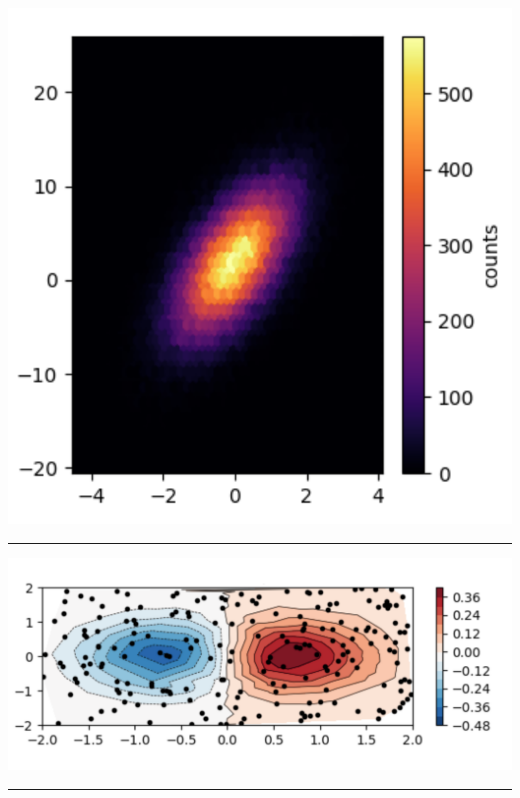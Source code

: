 \begin{task}
    \begin{gridlayout}{\textwidth}{10cm}
        \begin{row}{1}
            \begin{cell}{0.5}
                \centering
                \includegraphics[width=\cellwidth]{doc-one/img/plot-1.png}
                \rule{\cellwidth}{4pt}
            \end{cell}
            \begin{cell}{0.5}
                \centering
                \includegraphics[width=\cellwidth]{doc-one/img/plot-2.png}
                \rule{\cellwidth}{4pt}
            \end{cell}
        \end{row}
    \end{gridlayout}
\end{task}

